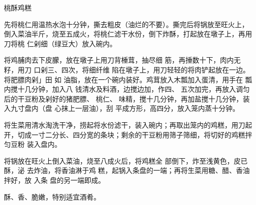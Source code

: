 \begin{recipe}{桃酥鸡糕}

\ingredients


\preparation

\step 先将桃仁用温热水泡十分钟，撕去粗皮（油烂的不要）。撕完后将锅放至旺火上，
倒入菜油半斤，烧至五成火，将桃仁滤干水份，倒下炸酥，打起放在墩子上，再用刀将桃
仁剁细（绿豆大）放入碗内。

将鸡脯肉去下皮朦，放在墩子上用刀背棰茸，抽尽细 筋，再捶数十下，肉内无籽，用刀
口剁三、四次，将细纤维 陷在墩子上，用刀轻轻的将肉铲起放在一边。将肥膘肉剁」田
如 油脂，放在一个碗内装好。鸡茸放入木瓢加入蛋清，用手在 瓢内搅十几分钟，加入八
钱清水及料酒，边搅边加，作四、 五次加完，再放入调匀后的干豆粉及剁好的猪肥膘、
桃仁、 味精，搅十几分钟，再加盐搅十几分钟，装入九寸盘内（盘 心抹上一层油），刮
平成方形，高四分，放入笼内蒸十分钟。

\step 将生菜用清水淘洗干净，捞起将水份滤干，装入碗内；再取出笼内的鸡糕，用刀起
开，切成一寸二分长、四分宽的条块；剩余的干豆粉用筛子筛细，将切好的鸡糕拌匀豆粉
装入盘内。

将锅放在旺火上倒入菜油，烧至八成火后，将鸡糕全 部倒下，炸至浅黄色，皮已酥，泌
去炸油，将香油淋于鸡 糕，起锅入条盘的一端；再将生菜用糖、醋、香油拌好，放 入条
盘的另一端即成。

\features

酥、香、脆嫩，特别适宜酒肴。

\end{recipe}

